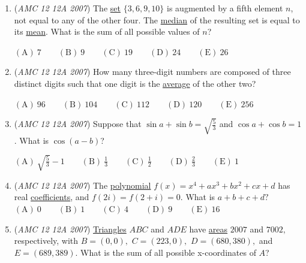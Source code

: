 \begin{enumerate}
 $(6-a)(6-b)(6-c)(6-d)(6-e)=45$

 What is $a+b+c+d+e$?


 $\mathrm{(A)}\ 5\qquad \mathrm{(B)}\ 17\qquad \mathrm{(C)}\ 25\qquad \mathrm{(D)}\ 27\qquad \mathrm{(E)}\ 30$


	\item (\textit{AMC 12 12A 2007}) The \href{https://artofproblemsolving.com/wiki/index.php?title=Set}{set} $\{3,6,9,10\}$ is augmented by a fifth element $n$, not equal to any of the other four. The \href{https://artofproblemsolving.com/wiki/index.php?title=Median}{median} of the resulting set is equal to its \href{https://artofproblemsolving.com/wiki/index.php?title=Mean}{mean}. What is the sum of all possible values of $n$?


 $\mathrm{(A)}\ 7\qquad \mathrm{(B)}\ 9\qquad \mathrm{(C)}\ 19\qquad \mathrm{(D)}\ 24\qquad \mathrm{(E)}\ 26$


	\item (\textit{AMC 12 12A 2007}) How many three-digit numbers are composed of three distinct digits such that one digit is the \href{https://artofproblemsolving.com/wiki/index.php?title=Average}{average} of the other two? 


 $\mathrm{(A)}\ 96\qquad \mathrm{(B)}\ 104\qquad \mathrm{(C)}\ 112\qquad \mathrm{(D)}\ 120\qquad \mathrm{(E)}\ 256$


	\item (\textit{AMC 12 12A 2007}) Suppose that $\sin a + \sin b = \sqrt{\frac{5}{3}}$ and $\cos a + \cos b = 1$. What is $\cos (a - b)$?


 $\mathrm{(A)}\ \sqrt{\frac{5}{3}} - 1\qquad \mathrm{(B)}\ \frac 13\qquad \mathrm{(C)}\ \frac 12\qquad \mathrm{(D)}\ \frac 23\qquad \mathrm{(E)}\ 1$


	\item (\textit{AMC 12 12A 2007}) The \href{https://artofproblemsolving.com/wiki/index.php?title=Polynomial}{polynomial} $f(x) = x^{4} + ax^{3} + bx^{2} + cx + d$ has real \href{https://artofproblemsolving.com/wiki/index.php?title=Coefficient}{coefficients}, and $f(2i) = f(2 + i) = 0.$ What is $a + b + c + d?$
$\mathrm{(A)}\ 0 \qquad \mathrm{(B)}\ 1 \qquad \mathrm{(C)}\ 4 \qquad \mathrm{(D)}\ 9 \qquad \mathrm{(E)}\ 16$


	\item (\textit{AMC 12 12A 2007}) \href{https://artofproblemsolving.com/wiki/index.php?title=Triangle}{Triangles} $ABC$ and $ADE$ have \href{https://artofproblemsolving.com/wiki/index.php?title=Area}{areas} $2007$ and $7002,$ respectively, with $B = (0,0),$ $C = (223,0),$ $D = (680,380),$ and $E = (689,389).$ What is the sum of all possible x-coordinates of $A$?



\end{enumerate}
